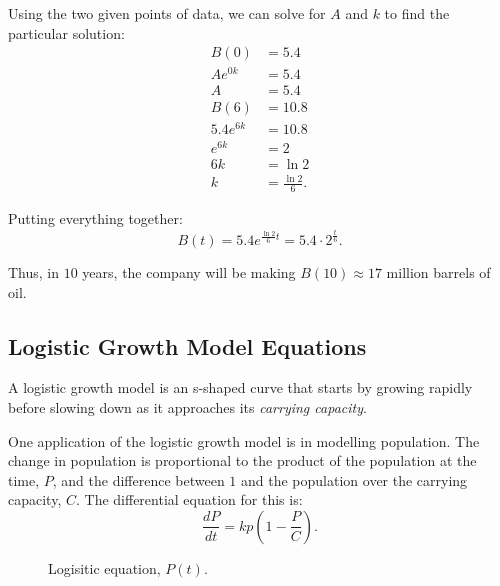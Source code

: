 \documentclass[12pt]{article}
\begin{document}
\begin{enumerate}
	Using the two given points of data, we can solve for $A$ and $k$ to find the particular solution:
	\begin{align*}
		B(0) &= 5.4 \\
		A e^{0k} &= 5.4 \\
		A &= 5.4 \\[12pt]
		B(6) &= 10.8 \\
		5.4 e^{6k} &= 10.8 \\
		e^{6k} &= 2 \\
		6k &= \ln 2 \\
		k &= \frac{\ln 2}{6}.
	\end{align*}

	Putting everything together:
	\[ B(t) = 5.4 e^{\frac{\ln 2}{6} t} = 5.4 \cdot 2^{\frac{t}{6}}. \]

	Thus, in $10$ years, the company will be making $B(10) \approx 17$ million barrels of oil.
\end{enumerate}

\subsection{Logistic Growth Model Equations}
A logistic growth model is an s-shaped curve that starts by growing rapidly before slowing down as it approaches its \textit{carrying capacity}.

One application of the logistic growth model is in modelling population. The change in population is proportional to the product of the population at the time, $P$, and the difference between $1$ and the population over the carrying capacity, $C$. The differential equation for this is:
\[ \frac{dP}{dt} = kp \left( 1 - \frac{P}{C} \right). \]

\begin{figure}[H]
	\centering
	\caption{Logisitic equation, $P(t)$.}
\end{figure}
\end{document}

